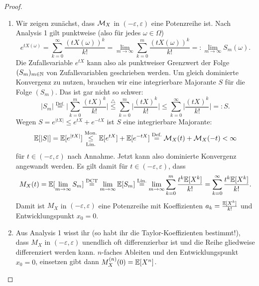 \begin{proof}\abs
	\begin{enumerate}[label=(\alph*)]
		\item Wir zeigen zun\"achst, dass $\mathcal{M}_X$ in $(-\varepsilon,\varepsilon)$ eine Potenzreihe ist. Nach Analysis 1 gilt punktweise (also f\"ur jedes $\omega\in \Omega$)
		\[ e^{tX(\omega)} = \sum\limits_{k=0}^{\infty} \frac{(tX(\omega))^k}{k!} = \lim\limits_{m \to \infty} \sum\limits_{k=0}^{m} \frac{(tX(\omega))^k}{k!} =: \lim\limits_{m \to \infty} S_m (\omega). \]
		Die Zufallsvariable $e^{tX}$ kann also als punktweiser Grenzwert der Folge $(S_m)_{m\in\mathbb{N}}$ von Zufallsvariablen geschrieben werden. Um gleich dominierte Konvergenz zu nutzen, brauchen wir eine integrierbare Majorante $S$ f\"ur die Folge $(S_m)$. Das ist gar nicht so schwer: \[ |S_m| \overset{\text{Def.}}{=} \Big|\sum\limits_{k=0}^{m} \frac{(tX)^k}{k!} \Big| \overset{\triangle}{\leq} 
		\sum\limits_{k=0}^{m} \Big| \frac{(tX)^k}{k!} \Big| \leq \sum\limits_{k=0}^{\infty} \Big| \frac{(tX)^k}{k!} \Big| =: S.
		\]
		Wegen $S=e^{|tX|} \leq e^{tX} + e^{-tX}$ ist $S$ eine integrierbare Majorante:
		\[ \mathbb{E}[|S|] = \mathbb{E}[e^{|tX|}] \overset{\text{Mon.}}{\underset{\text{Lin.}}{\leq}} \mathbb{E}[e^{tX}] + \mathbb{E}[e^{-tX}] \overset{\text{Def.}}{=} \mathcal{M}_X(t) + \mathcal{M}_X(-t) < \infty
		\]
		f\"ur $t\in (-\varepsilon,\varepsilon)$ nach Annahme. Jetzt kann also dominierte Konvergenz angewandt werden. Es gilt damit f\"ur $t\in (-\varepsilon,\varepsilon)$, dass
		\begin{align*}
		M_X(t)=\mathbb{E}[\lim_{m\to\infty} S_m] \overset{\text{DCT}}{=} \lim_{m\to\infty} \mathbb{E}[S_m]\overset {\text{Lin.}}{=} \lim_{m\to\infty} \sum_{k=0}^m\frac{t^k \mathbb{E}[X^k]}{k!}=\sum_{k=0}^\infty\frac{t^k \mathbb{E}[X^k]}{k!}.
		\end{align*}
		Damit ist $M_X$ in $(-\varepsilon,\varepsilon)$ eine Potenzreihe mit Koeffizienten $a_k=\frac{\mathbb{E}[X^k]}{k!}$ und Entwicklungspunkt $x_0=0$.
		\item	Aus Analysis 1 wisst ihr (so habt ihr die Taylor-Koeffizienten bestimmt!), dass $M_X$ in $(-\varepsilon, \varepsilon)$ unendlich oft differenzierbar ist und die Reihe gliedweise differenziert werden kann. $n$-faches Ableiten und den Entwicklungspunkt $x_0=0$, einsetzen gibt dann $M_X^{(n)}(0)=\mathbb{E}[X^n]$.
	\end{enumerate}
\end{proof}

